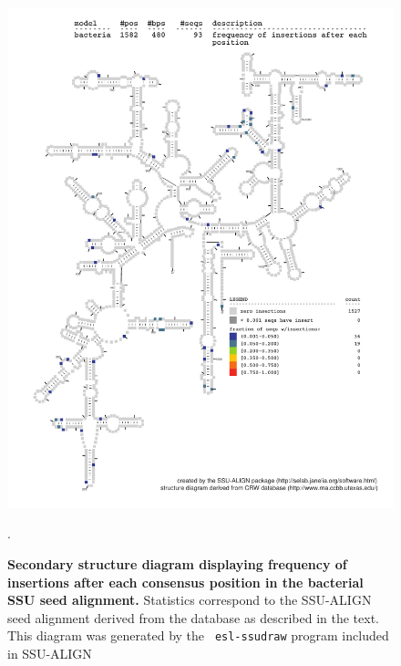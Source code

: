 \begin{figure}
\begin{center}
\includegraphics[width=5.7in]{Figures/bacteria-0p1-ifreq}
\end{center}
\caption[Secondary structure diagram displaying frequency of insertions
  after each consensus position in the bacterial SSU seed
  alignment]{\textbf{Secondary structure diagram displaying frequency
  of insertions after each consensus position in the bacterial SSU seed
  alignment.} Statistics correspond to the SSU-ALIGN seed
  alignment derived from the  database \cite{CannoneGutell02}
  as described in the text. This diagram was generated by the {\tt
  esl-ssudraw} program included in SSU-ALIGN}.
\label{fig:bacins}
\end{figure}




